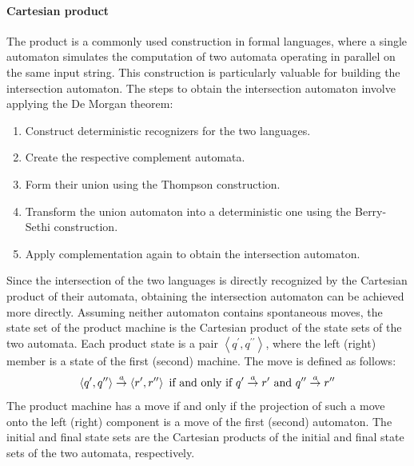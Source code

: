 \paragraph*{Cartesian product}
The product is a commonly used construction in formal languages, where a single automaton simulates the computation of two automata operating in parallel on the same input string. 
This construction is particularly valuable for building the intersection automaton. 
The steps to obtain the intersection automaton involve applying the De Morgan theorem:
\begin{enumerate}
    \item Construct deterministic recognizers for the two languages.
    \item Create the respective complement automata.
    \item Form their union using the Thompson construction.
    \item Transform the union automaton into a deterministic one using the Berry-Sethi construction.
    \item Apply complementation again to obtain the intersection automaton.
\end{enumerate}
Since the intersection of the two languages is directly recognized by the Cartesian product of their automata, obtaining the intersection automaton can be achieved more directly.
Assuming neither automaton contains spontaneous moves, the state set of the product machine is the Cartesian product of the state sets of the two automata. 
Each product state is a pair $\left\langle q^{\prime},q^{\prime\prime} \right\rangle $, where the left (right) member is a state of the first (second) machine.
The move is defined as follows:
\[\left\langle q^{\prime},q^{\prime\prime} \right\rangle \overset{a}{\rightarrow} \left\langle r^{\prime},r^{\prime\prime} \right\rangle \textnormal{ if and only if } q^{\prime} \overset{a}{\rightarrow} r^{\prime} \textnormal{ and } q^{\prime\prime} \overset{a}{\rightarrow} r^{\prime\prime}\]
The product machine has a move if and only if the projection of such a move onto the left (right) component is a move of the first (second) automaton. 
The initial and final state sets are the Cartesian products of the initial and final state sets of the two automata, respectively.
